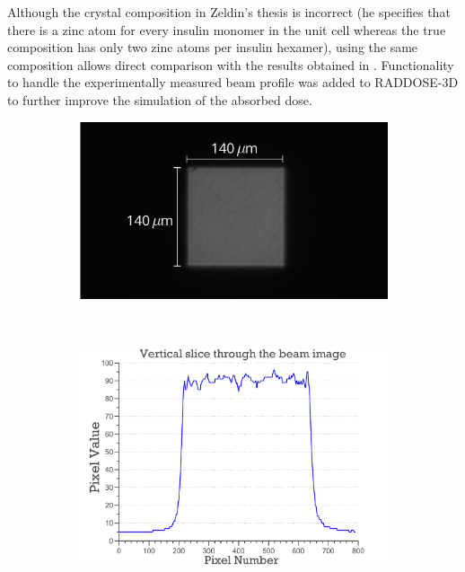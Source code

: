 Although the crystal composition in Zeldin's thesis is incorrect (he specifies that there is a zinc atom for every insulin monomer in the unit cell whereas the true composition has only two zinc atoms per insulin hexamer), using the same composition allows direct comparison with the results obtained in \cite{zeldin2013dwd}.
Functionality to handle the experimentally measured beam profile was added to RADDOSE-3D to further improve the simulation of the absorbed dose.
\begin{figure}
        \centering
        \begin{subfigure}[b]{1\textwidth}
                \centering
                \includegraphics[width=\textwidth]{figures/dwd/hamburg_beampgm.pdf}
                \caption{}
                \label{fig: Hamburg beam PGM}
        \end{subfigure}
				\\
        \begin{subfigure}[b]{1\textwidth}
                \centering
                \includegraphics[width=\textwidth]{figures/dwd/beamslice.pdf}
                \caption{}
                \label{fig:Hamburg beamslice}
        \end{subfigure}
\end{figure}
